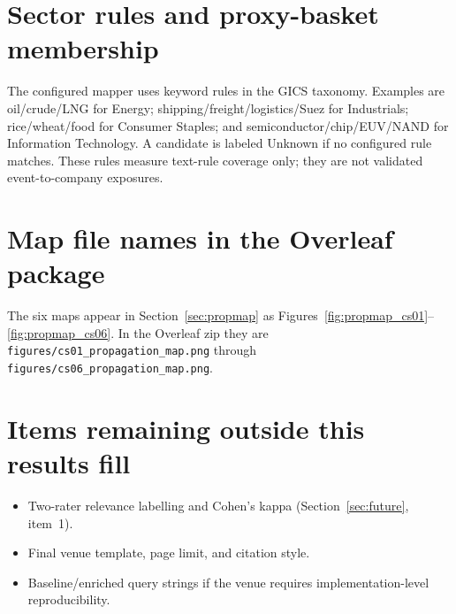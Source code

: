 \documentclass[10pt,a4paper,twocolumn]{article}
\begin{document}
\section{Sector rules and proxy-basket membership}\label{app:taxonomy}

The configured mapper uses keyword rules in the GICS taxonomy. Examples are oil/crude/LNG for Energy; shipping/freight/logistics/Suez for Industrials; rice/wheat/food for Consumer Staples; and semiconductor/chip/EUV/NAND for Information Technology. A candidate is labeled Unknown if no configured rule matches. These rules measure text-rule coverage only; they are not validated event-to-company exposures.

\section{Map file names in the Overleaf package}\label{app:maps}

The six maps appear in Section~\ref{sec:propmap} as Figures~\ref{fig:propmap_cs01}--\ref{fig:propmap_cs06}. In the Overleaf zip they are \texttt{figures/cs01\_propagation\_map.png} through \texttt{figures/cs06\_propagation\_map.png}.

\section{Items remaining outside this results fill}
\begin{itemize}
  \item Two-rater relevance labelling and Cohen's kappa (Section~\ref{sec:future}, item~1).
  \item Final venue template, page limit, and citation style.
  \item Baseline/enriched query strings if the venue requires implementation-level reproducibility.
\end{itemize}
\end{document}
